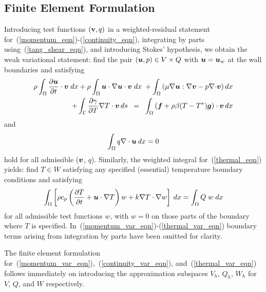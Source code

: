 \subsection{Finite Element Formulation}
Introducing test functions $({\bf v}, q)$ in a weighted-residual
statement for~(\ref{momentum_eqn})-(\ref{continuity_eqn}), integrating
by
parts using~(\ref{tang_shear_eqn}), and introducing Stokes' hypothesis,
we obtain the weak variational statement: find the pair $(\mbox{\boldmath $u$}, p) \in
V \times Q$ with $\mbox{\boldmath $u$} = \mbox{\boldmath $u$}_w$ at the wall boundaries and satisfying
\begin{eqnarray}
  \rho \int_{\Omega} \frac{\partial \mbox{\boldmath $u$}}{\partial t} \cdot \mbox{\boldmath $v$} \;dx +
  \rho \int_\Omega\mbox{\boldmath $u$}\cdot\mathbf{\nabla}\mbox{\boldmath $u$}\cdot\mbox{\boldmath $v$} \;dx\; +
  \int_{\Omega}{\left(\mu {\mathbf{\nabla}} \mbox{\boldmath $u$} : {\mathbf{\nabla}}
\mbox{\boldmath $v$} - p
      {\mathbf{\nabla \cdot}} \mbox{\boldmath $v$} \right) dx}
  \nonumber \\
  + \int_{\Gamma}{\frac{\partial \gamma}{\partial T}
    {\mathbf{\nabla}}T
    \cdot {\mbox{\boldmath $v$}} \,ds}
  \;\; =\;\; \int_{\Omega}{\left( {\mbox{\boldmath $f$}} +
      \rho\beta(T-T^*){\mbox{\boldmath $g$}}\right)\cdot {\mbox{\boldmath $v$}} \,
    dx}
  \label{momentum_var_eqn}
\end{eqnarray}
\noindent and
\begin{equation}
  \int_{\Omega}{{q\bf{\nabla} \cdot \mbox{\boldmath $u$}} \: dx} = 0
  \label{continuity_var_eqn}
\end{equation}
\noindent hold for all admissible ($\mbox{\boldmath $v$}$, $q$). Similarly, the
weighted integral for~(\ref{thermal_eqn}) yields: find $T \in W$
satisfying any specified (essential) temperature boundary conditions
and satisfying
\begin{eqnarray}
  \int_{\Omega} \left[\rho c_p \left(\frac{\partial T}{\partial t}
      + {\mbox{\boldmath $u$} \cdot \mathbf{\nabla}} T\right) w +
    k\mathbf{\nabla}T\cdot {\mathbf{\nabla}}w\right]  \: dx
  = \int_{\Omega}{ Q \; w \; dx}
  \label{thermal_var_eqn}
\end{eqnarray}
\noindent
for all admissible test functions $w$, with $w = 0$ on those
parts of the boundary where $T$ is specified. In~(\ref{momentum_var_eqn})-(\ref{thermal_var_eqn}) boundary terms arising from integration by parts have been omitted for clarity.

The finite element formulation
for~(\ref{momentum_var_eqn}),~(\ref{continuity_var_eqn}),
and~(\ref{thermal_var_eqn}) follows immediately on introducing the
approximation subspaces $V_h$, $Q_h$, $W_h$ for $V$, $Q$, and $W$
respectively.

